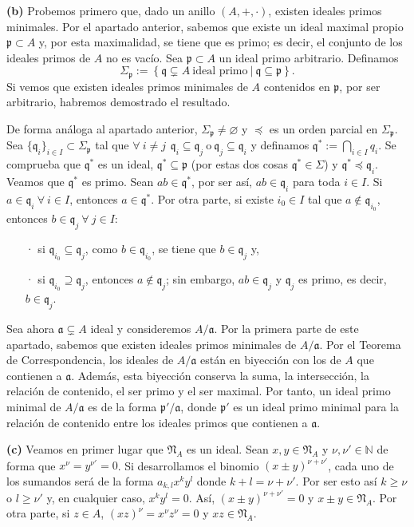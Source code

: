 \documentclass[a4paper,12pt]{article}
\newcommand{\N}{\mathbb{N}}
\newcommand{\p}{\mathfrak{p}}
\newcommand{\q}{\mathfrak{q}}
\newcommand{\af}{\mathfrak{a}}
\newcommand{\Nf}{\mathfrak{N}}
\begin{document}
\textbf{(b)} Probemos primero que, dado un anillo $(A,+,\cdot)$, existen ideales primos minimales. Por el apartado anterior, sabemos que existe un ideal maximal propio $\p\subset A$ y, por esta maximalidad, se tiene que es primo; es decir, el conjunto de los ideales primos de $A$ no es vacío. Sea $\p\subset A$ un ideal primo arbitrario.
Definamos$$\Sigma_{\p}:=\left\{\q\subsetneq A\ \text{ideal primo}\ |\ \q\subseteq\p \right\}.$$Si vemos que existen ideales primos minimales de $A$ contenidos en $\p$, por ser arbitrario, habremos demostrado el resultado.

De forma análoga al apartado anterior, $\Sigma_{\p}\neq\varnothing$ y $\preceq$ es un orden parcial en $\Sigma_{\p}$. Sea $\{\q_i\}_{i\in I}\subset\Sigma_{\p}$ tal que $\forall\ i\neq j\hspace{5pt}\q_i\subseteq\q_j\ \text{o}\ \q_j\subseteq\q_i$ y definamos $\q^*:=\bigcap_{i\in I}q_i$.
Se comprueba que $\q^*$ es un ideal, $\q^*\subseteq\p$ (por estas dos cosas $\q^*\in\Sigma$) y $\q^*\preceq\q_i$.
Veamos que $\q^*$ es primo. Sean $ab\in\q^*$, por ser así, $ab\in\q_i$ para toda $i\in I$. Si $a\in\q_i\ \forall\ i\in I$, entonces $a\in\q^*$. Por otra parte, si existe $i_0\in I$ tal que $a\notin\q_{i_0}$, entonces $b\in\q_j\ \forall\ j\in I$:\begin{itemize}
    \item[·] si $\q_{i_0}\subseteq\q_j$, como $b\in\q_{i_0}$, se tiene que $b\in\q_j$ y,
    \item[·] si $\q_{i_0}\supseteq\q_j$, entonces $a\notin\q_j$; sin embargo, $ab\in\q_j$ y $\q_j$ es primo, es decir, $b\in\q_j$.
\end{itemize}
Sea ahora $\af\subsetneq A$ ideal y consideremos $A/\af$. Por la primera parte de este apartado, sabemos que existen ideales primos minimales de $A/\af$.
Por el Teorema de Correspondencia, los ideales de $A/\af$ están en biyección con los de $A$ que contienen a $\af$.
Además, esta biyección conserva la suma, la intersección, la relación de contenido, el ser primo y el ser maximal.
Por tanto, un ideal primo minimal de $A/\af$ es de la forma $\p'/\af$, donde $\p'$ es un ideal primo minimal para la relación de contenido entre los ideales primos que contienen a $\af$.

\textbf{(c)} Veamos en primer lugar que $\Nf_A$ es un ideal. Sean $x,y\in\Nf_A$ y $\nu,\nu'\in\N$ de forma que $x^\nu=y^{\nu'}=0$. Si desarrollamos el binomio $(x\pm y)^{\nu+\nu'}$, cada uno de los sumandos será de la forma $a_{k,l}x^ky^l$ donde $k+l=\nu+\nu'$. Por ser esto así $k\geq\nu$ o $l\geq\nu'$ y, en cualquier caso, $x^ky^l=0$. Así, $(x\pm y)^{\nu+\nu'}=0$ y $x\pm y\in\Nf_A$. Por otra parte, si $z\in A$, $(xz)^\nu=x^\nu z^\nu=0$ y $xz\in\Nf_A$.
\end{document}
